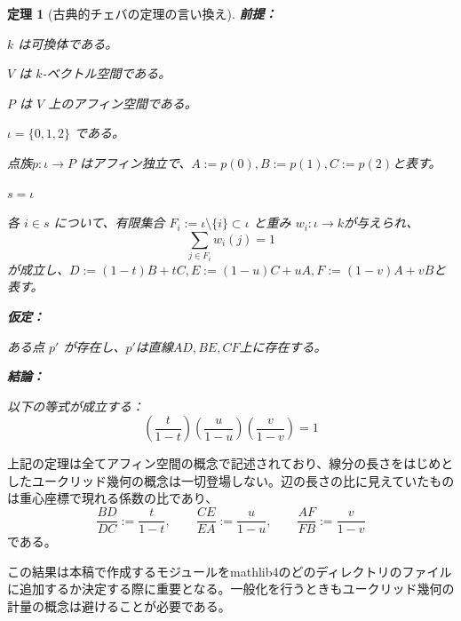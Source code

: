 \documentclass[a4paper,12pt]{bxjsbook}
\newlength{\customindent}
\newenvironment{body}{
  \par
  \begingroup
  \setlength{\leftskip}{\customindent}
  \setlength{\rightskip}{0pt}
  \setlength{\parindent}{1em}
  \setlength{\displayindent}{\customindent}
  \setlength{\displaywidth}{\dimexpr\linewidth-\customindent\relax}
}{
  \par
  \endgroup
}
\theoremstyle{theorem}
\newtheorem{theorem}{定理}[chapter]
\begin{document}
    \begin{theorem}[古典的チェバの定理の言い換え]

        \noindent\textbf{前提：}\par
        \begin{theoremenumerate}[label=(P\arabic*), leftmargin=4em, topsep=2pt, partopsep=0pt, itemsep=0pt, parsep=0pt]
            \item $k$ は可換体である。
            \item $V$ は $k$-ベクトル空間である。
            \item $P$ は $V$ 上のアフィン空間である。
            \item $\iota = \{0,1,2\}$ である。
            \item 点族$p:\iota \to P$ はアフィン独立で、$A:=p(0), B:=p(1), C:=p(2)$と表す。
            \item $s = \iota$          
            \item 各 $i\in s$ について、有限集合 $F_i:=\iota\setminus\{i\}\subset \iota$ と重み $w_i:\iota\to k$が与えられ、
            \[
            \sum_{j\in F_i} w_i(j)=1
            \]
            が成立し、$D:=(1-t)B+tC, E:=(1-u)C+uA, F:=(1-v)A+vB$と表す。
        \end{theoremenumerate}
        
        \noindent\textbf{仮定：}\par
        \begin{theoremenumerate}[label=(A\arabic*), leftmargin=4em, topsep=2pt, partopsep=0pt, itemsep=0pt, parsep=0pt]
          \item ある点 $p'$ が存在し、$p'$は直線$AD, BE, CF$上に存在する。
        \end{theoremenumerate}
        
        \noindent\textbf{結論：}\par
        \begin{theoremenumerate}[label=(\roman*), leftmargin=4em, topsep=2pt, partopsep=0pt, itemsep=0pt, parsep=0pt]
          \item 以下の等式が成立する：
          \[
          \left(\frac{t}{1-t}\right)\left(\frac{u}{1-u}\right)\left(\frac{v}{1-v}\right)=1
          \]
        \end{theoremenumerate}
    \end{theorem}

    \begin{body}

        \indent 上記の定理は全てアフィン空間の概念で記述されており、線分の長さをはじめとしたユークリッド幾何の概念は一切登場しない。辺の長さの比に見えていたものは重心座標で現れる係数の比であり、
        \[
        \dfrac{BD}{DC} := \dfrac{t}{1-t},\qquad
        \dfrac{CE}{EA} := \dfrac{u}{1-u},\qquad
        \dfrac{AF}{FB} := \dfrac{v}{1-v}
        \]
        である。

        \indent この結果は本稿で作成するモジュールをmathlib4のどのディレクトリのファイルに追加するか決定する際に重要となる。一般化を行うときもユークリッド幾何の計量の概念は避けることが必要である。

    \end{body}
\end{document}
